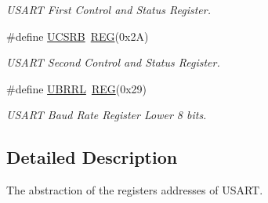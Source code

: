 \begin{DoxyCompactItemize}
\begin{DoxyCompactList}\small\item\em U\+S\+A\+R\+T First Control and Status Register. \end{DoxyCompactList}\item 
\hypertarget{group__USARTMCAL_ga1135aeaa2c58aad7ef57b34815f4becb}{\#define \hyperlink{group__USARTMCAL_ga1135aeaa2c58aad7ef57b34815f4becb}{U\+C\+S\+R\+B}~\hyperlink{group__MCAL_ga72e45020e46f285689db51c46f273403}{R\+E\+G}(0x2\+A)}\label{group__USARTMCAL_ga1135aeaa2c58aad7ef57b34815f4becb}

\begin{DoxyCompactList}\small\item\em U\+S\+A\+R\+T Second Control and Status Register. \end{DoxyCompactList}\item 
\hypertarget{group__USARTMCAL_ga0086cfbd45570ab91f16a0faec612e66}{\#define \hyperlink{group__USARTMCAL_ga0086cfbd45570ab91f16a0faec612e66}{U\+B\+R\+R\+L}~\hyperlink{group__MCAL_ga72e45020e46f285689db51c46f273403}{R\+E\+G}(0x29)}\label{group__USARTMCAL_ga0086cfbd45570ab91f16a0faec612e66}

\begin{DoxyCompactList}\small\item\em U\+S\+A\+R\+T Baud Rate Register Lower 8 bits. \end{DoxyCompactList}\end{DoxyCompactItemize}


\subsection{Detailed Description}
The abstraction of the registers addresses of U\+S\+A\+R\+T. 


